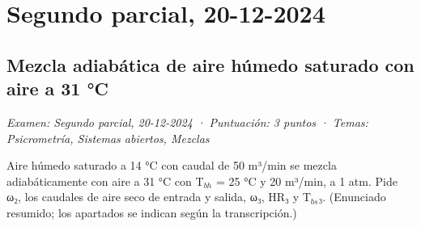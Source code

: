 \documentclass[11pt,a4paper]{article}
\begin{document}
\section{Segundo parcial, 20-12-2024}

\subsection{Mezcla adiabática de aire húmedo saturado con aire a 31 °C}
\noindent\textit{Examen: Segundo parcial, 20-12-2024 · Puntuación: 3 puntos · Temas: Psicrometría, Sistemas abiertos, Mezclas}\par\medskip

Aire húmedo saturado a 14 °C con caudal de 50 m³/min se mezcla adiabáticamente con aire a 31 °C con T$_{bh}$ = 25 °C y 20 m³/min, a 1 atm. Pide ω₂, los caudales de aire seco de entrada y salida, ω₃, HR₃ y T$_{bs}$₃. (Enunciado resumido; los apartados se indican según la transcripción.)
\end{document}
